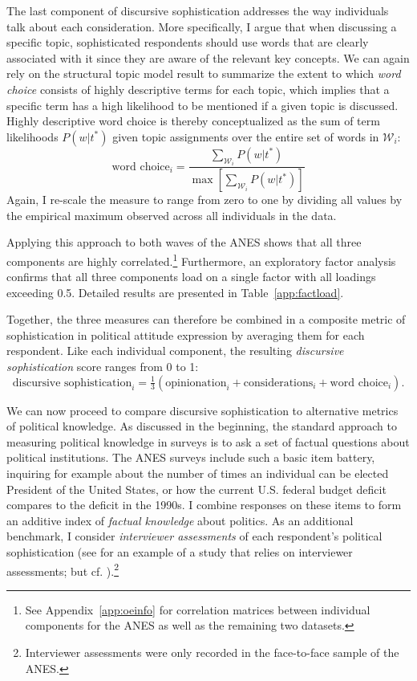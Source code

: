 The last component of discursive sophistication addresses the way individuals talk about each consideration. More specifically, I argue that when discussing a specific topic, sophisticated respondents should use words that are clearly associated with it since they are aware of the relevant key concepts. We can again rely on the structural topic model result to summarize the extent to which \textit{word choice} consists of highly descriptive terms for each topic, which implies that a specific term has a high likelihood to be mentioned if a given topic is discussed. Highly descriptive word choice is thereby conceptualized as the sum of term likelihoods $P(w|t^*)$ given topic assignments over the entire set of words in $\mathcal{W}_i$:
\begin{equation}
\text{word choice}_i = \dfrac{\sum_{\mathcal{W}_i} P(w|t^*)}{\max\left[\sum_{\mathcal{W}_i} P(w|t^*)\right]}
\end{equation}
Again, I re-scale the measure to range from zero to one by dividing all values by the empirical maximum observed across all individuals in the data.

Applying this approach to both waves of the ANES shows that all three components are highly correlated.\footnote{See Appendix~\ref{app:oeinfo} for correlation matrices between individual components for the ANES as well as the remaining two datasets.} Furthermore, an exploratory factor analysis confirms that all three components load on a single factor with all loadings exceeding 0.5. Detailed results are presented in Table~\ref{app:factload}.



Together, the three measures can therefore be combined in a composite metric of sophistication in political attitude expression by averaging them for each respondent. Like each individual component, the resulting \textit{discursive sophistication} score ranges from 0 to 1:
\begin{equation}
\text{discursive sophistication}_i = \tfrac{1}{3}(\text{opinionation}_i + \text{considerations}_i + \text{word choice}_i).
\end{equation}

We can now proceed to compare discursive sophistication to alternative metrics of political knowledge. As discussed in the beginning, the standard approach to measuring political knowledge in surveys is to ask a set of factual questions about political institutions. The ANES surveys include such a basic item battery, inquiring for example about the number of times an individual can be elected President of the United States, or how the current U.S. federal budget deficit compares to the deficit in the 1990s. I combine responses on these items to form an additive index of \textit{factual knowledge} about politics. As an additional benchmark, I consider \textit{interviewer assessments} of each respondent's political sophistication (see \citealt{bartels2005homer} for an example of a study that relies on interviewer assessments; but cf. \citealt{ryan2011accuracy}).\footnote{Interviewer assessments were only recorded in the face-to-face sample of the ANES.}

